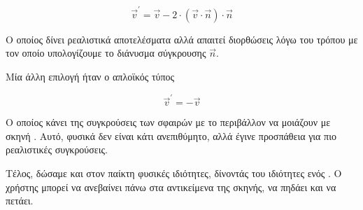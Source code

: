 \documentclass[11pt]{scrartcl} %
\begin{document}
\begin{equation}
    \vec{v}^\prime = \vec{v} - 2 \cdot ( \vec{v} \cdot \vec{n} ) \cdot \vec{n}
\end{equation}

Ο οποίος δίνει ρεαλιστικά αποτελέσματα αλλά απαιτεί διορθώσεις λόγω του τρόπου με τον οποίο υπολογίζουμε το διάνυσμα 
σύγκρουσης $\vec{n}$. 

Μία άλλη επιλογή ήταν ο απλοϊκός τύπος 

\begin{equation}
    \vec{v}^\prime = -\vec{v}
\end{equation}

Ο οποίος κάνει της συγκρούσεις των σφαιρών με το περιβάλλον να μοιάζουν με σκηνή . Αυτό, φυσικά 
δεν είναι κάτι ανεπιθύμητο, αλλά έγινε προσπάθεια για πιο ρεαλιστικές συγκρούσεις.

Τέλος, δώσαμε και στον παίκτη φυσικές ιδιότητες, δίνοντάς του ιδιότητες ενός . 
Ο χρήστης μπορεί να ανεβαίνει πάνω στα αντικείμενα της σκηνής, να πηδάει και να πετάει.

\end{document}

